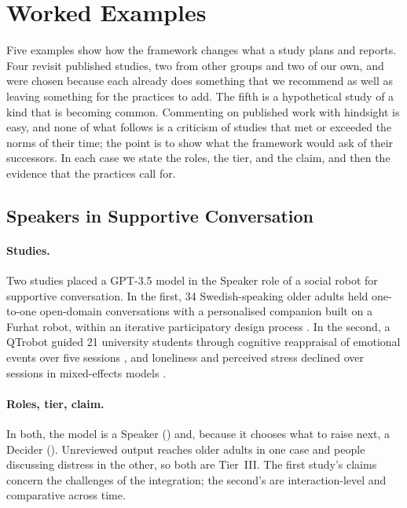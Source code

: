 \section{Worked Examples}
\label{sec:examples}

Five examples show how the framework changes what a study plans and reports.
Four revisit published studies, two from other groups and two of our own, and
were chosen because each already does something that we recommend as well as
leaving something for the practices to add. The fifth is a hypothetical study
of a kind that is becoming common. Commenting on published work with
hindsight is easy, and none of what follows is a criticism of studies that
met or exceeded the norms of their time; the point is to show what the
framework would ask of their successors. In each case we state the roles, the
tier, and the claim, and then the evidence that the practices call for.

\subsection{Speakers in Supportive Conversation}
\label{sec:exA}

\paragraph{Studies.} Two studies placed a GPT-3.5 model in the Speaker role
of a social robot for supportive conversation. In the first, 34
Swedish-speaking older adults held one-to-one open-domain conversations with
a personalised companion built on a Furhat robot, within an iterative
participatory design process \cite{irfan2025between}. In the second, a
QTrobot guided 21 university students through cognitive reappraisal of
emotional events over five sessions \cite{laban2026robotled}, and loneliness
and perceived stress declined over sessions in mixed-effects models
\cite{laban2025what}.

\paragraph{Roles, tier, claim.} In both, the model is a Speaker ()
and, because it chooses what to raise next, a Decider (). Unreviewed
output reaches older adults in one case and people discussing distress in the
other, so both are Tier~III. The first study's claims concern the challenges
of the integration; the second's are interaction-level and comparative across
time.

